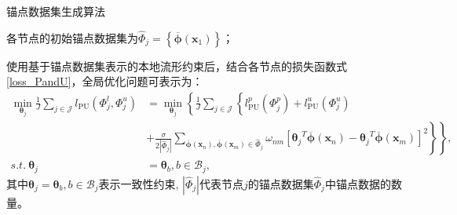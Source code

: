 \begin{algorithm}[htbp]
	\caption{锚点数据集生成算法}
	\label{Anchor_manifold}
	\LinesNumbered
    各节点的初始锚点数据集为$\hat{\boldsymbol\varPhi}_j=\left\{\overline{\boldsymbol\phi}\left(\boldsymbol x_1\right)\right\}$； \\
\end{algorithm}

使用基于锚点数据集表示的本地流形约束后，结合各节点的损失函数式\eqref{loss_PandU}，全局优化问题可表示为：
\begin{equation}
    \label{loss_PandU_Anchor}
    \begin{split}
        \min_{\boldsymbol \theta_j} \frac{1}{J}\sum\limits_{j \in \mathcal{J}}l_{\mathrm{PU}}\left(\boldsymbol\varPhi_j^l,\boldsymbol\varPhi_j^u\right)&=
        \min_{\boldsymbol \theta_j} \left\{\frac{1}{J}\sum\limits_{j \in \mathcal{J}} \left\{
        l_{\mathrm{PU}}^p\left(\boldsymbol \varPhi_j^p\right)+l_{\mathrm{PU}}^u\left(\boldsymbol \varPhi_j^u\right) \right. \right.\\
        &\left. \left.+\frac{\sigma }{2\left|\hat{\boldsymbol\varPhi}_j\right|} \sum_{\overline{\boldsymbol\phi}\left(\boldsymbol{x}_n\right),\overline{\boldsymbol\phi}\left(\boldsymbol{x}_m\right)\in\hat{\boldsymbol\varPhi}_j}
        \omega_{nm}\left[{\boldsymbol{\theta}_j}^T\overline{\boldsymbol\phi}\left(\boldsymbol{x}_n\right)
        -{\boldsymbol{\theta}_j}^T\overline{\boldsymbol\phi}\left(\boldsymbol{x}_m\right)\right]^{2} \right\} \right\}, \\
        s.t.~\boldsymbol{\theta}_j&=\boldsymbol{\theta}_b,b \in \mathcal{B}_j,
    \end{split}
\end{equation}
其中$\boldsymbol{\theta}_j=\boldsymbol{\theta}_b,b \in \mathcal{B}_j$表示一致性约束,
$\left|\hat{\boldsymbol\varPhi}_j\right|$代表节点$j$的锚点数据集$\hat{\boldsymbol\varPhi}_j$中锚点数据的数量。

